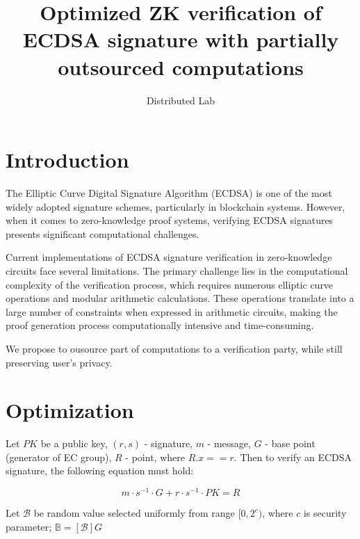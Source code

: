 \documentclass{iacrtrans}
\author{Distributed Lab}
\institute{Distributed Lab}
\title{Optimized ZK verification of ECDSA signature with partially outsourced computations}
\begin{document}
\maketitle


\section{Introduction}
The Elliptic Curve Digital Signature Algorithm (ECDSA) is one of the most widely adopted signature schemes, particularly in blockchain systems. 
However, when it comes to zero-knowledge proof systems, verifying ECDSA signatures presents significant computational challenges.

Current implementations of ECDSA signature verification in zero-knowledge circuits face several limitations. 
The primary challenge lies in the computational complexity of the verification process, which requires numerous elliptic curve operations and modular arithmetic calculations. 
These operations translate into a large number of constraints when expressed in arithmetic circuits, making the proof generation process computationally intensive and time-consuming.

We propose to ousource part of computations to a verification party, while still preserving user's privacy.

\section{Optimization}
Let $PK$ be a public key, $(r, s)$ - signature, $m$ - message, $G$ - base point (generator of EC group), $R$ - point, where $R.x == r$.
Then to verify an ECDSA signature, the following equation must hold:

\begin{equation}
    m \cdot s^{-1} \cdot G + r \cdot s^{-1} \cdot PK = R
\end{equation}

Let $\mathcal{B}$ be random value selected uniformly from range $[0, 2^c)$, where $c$ is security parameter; 
$\mathbb{B} = [\mathcal{B}]G$



\setcounter{tocdepth}{2}
\end{document}
